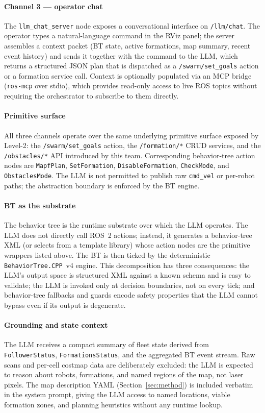 \documentclass[conference]{IEEEtran}
\begin{document}
\paragraph{Channel 3 --- operator chat}
The \texttt{llm\_chat\_server} node exposes a conversational
interface on \texttt{/llm/chat}. The operator types a
natural-language command in the RViz panel; the server
assembles a context packet (BT state, active formations, map
summary, recent event history) and sends it together with the
command to the LLM, which returns a structured JSON plan that
is dispatched as a \texttt{/swarm/set\_goals} action or a
formation service call. Context is optionally populated via an
MCP bridge (\texttt{ros-mcp} over stdio), which provides
read-only access to live ROS topics without requiring the
orchestrator to subscribe to them directly.

\paragraph{Primitive surface}
All three channels operate over the same underlying primitive
surface exposed by Level-2: the \texttt{/swarm/set\_goals}
action, the \texttt{/formation/*} CRUD services, and the
\texttt{/obstacles/*} API introduced by this team.
Corresponding behavior-tree action nodes are
\texttt{MapfPlan}, \texttt{SetFormation},
\texttt{DisableFormation}, \texttt{CheckMode}, and
\texttt{ObstaclesMode}. The LLM is not permitted to publish
raw \texttt{cmd\_vel} or per-robot paths; the abstraction
boundary is enforced by the BT engine.

\paragraph{BT as the substrate}
The behavior tree is the runtime substrate over which the LLM
operates. The LLM does not directly call ROS~2 actions;
instead, it generates a behavior-tree XML (or selects from a
template library) whose action nodes are the primitive
wrappers listed above. The BT is then ticked by the
deterministic \texttt{BehaviorTree.CPP}~v4 engine. This
decomposition has three consequences: the LLM's output space
is structured XML against a known schema and is easy to
validate; the LLM is invoked only at decision boundaries, not
on every tick; and behavior-tree fallbacks and guards encode
safety properties that the LLM cannot bypass even if its
output is degenerate.

\paragraph{Grounding and state context}
The LLM receives a compact summary of fleet state derived from
\texttt{FollowerStatus}, \texttt{FormationsStatus}, and the
aggregated BT event stream. Raw scans and per-cell costmap
data are deliberately excluded: the LLM is expected to reason
about robots, formations, and named regions of the map, not
laser pixels. The map description YAML (Section~\ref{sec:method})
is included verbatim in the system prompt, giving the LLM
access to named locations, viable formation zones, and
planning heuristics without any runtime lookup.
\end{document}
